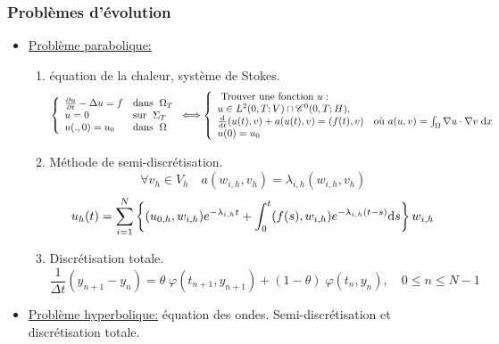 \documentclass{article}
\def \de {{\rm d}}
\begin{document}
\subsubsection*{Problèmes d'évolution}
\begin{itemize}[label=\textbullet, font=\small \color{blue}]
\item \underline{Problème parabolique:} 
\begin{enumerate}
\item équation de la chaleur, système de Stokes. 
\[\left\{\begin{array}{ll}
\frac{\partial u}{\partial t}-\Delta u = f &\mbox{dans }\; \Omega_T\\
u=0 &\mbox{sur }\; \Sigma_T\\
u(.,0)=u_0 &\mbox{dans }\; \Omega
\end{array}\right. \Longleftrightarrow \left\{\begin{array}{ll}
\mbox{ Trouver une fonction } u :&\\
u\in L^2(0,T;V)\cap {\cal C}^0(0,T;H), & \\
\frac{\de}{\de t}(u(t),v)+a(u(t),v)=(f(t),v) & \mbox{où } a(u,v)=\int_\Omega \nabla u\cdot \nabla v \; \de x\\
u(0)=u_0 &
\end{array}\right.\]
\item  Méthode de semi-discrétisation.
\[\forall v_h\in V_h \quad a(w_{i,h},v_h)=\lambda_{i,h} (w_{i,h},v_h)\]
\[u_h(t)=\sum_{i=1}^N\left\{(u_{0,h},w_{i,h})e^{-\lambda_{i,h}t}+\int_0^t(f(s),w_{i,h})e^{-\lambda_{i,h}(t-s)}\de s\right\}w_{i,h}\]
\item  Discrétisation totale.
\[\frac{1}{\Delta t}(y_{n+1}-y_n)=\theta\;\varphi(t_{n+1},y_{n+1})+(1-\theta)\;\varphi(t_{n},y_{n}),\quad 0\leq n\leq N-1\]
\end{enumerate}





\item \underline{Problème hyperbolique:} équation des ondes. Semi-discrétisation et discrétisation totale.


\end{itemize}
\end{document}
